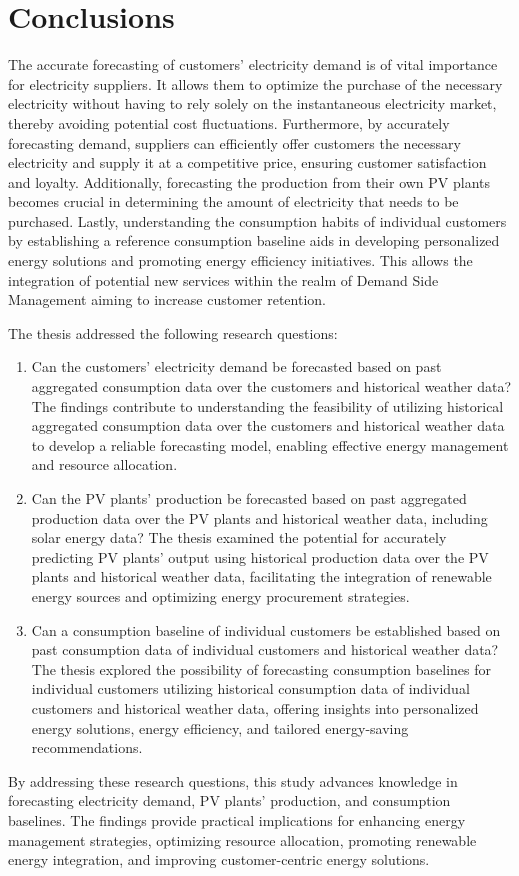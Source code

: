 \chapter{Conclusions}
\label{cha:conclusions}
\vspace{0.4 cm}

The accurate forecasting of customers' electricity demand is of vital importance for electricity suppliers.
It allows them to optimize the purchase of the necessary electricity without having to rely solely on the instantaneous electricity market, thereby avoiding potential cost fluctuations.
Furthermore, by accurately forecasting demand, suppliers can efficiently offer customers the necessary electricity and supply it at a competitive price, ensuring customer satisfaction and loyalty.
Additionally, forecasting the production from their own PV plants becomes crucial in determining the amount of electricity that needs to be purchased.
Lastly, understanding the consumption habits of individual customers by establishing a reference consumption baseline aids in developing personalized energy solutions and promoting energy efficiency initiatives.
This allows the integration of potential new services within the realm of Demand Side Management aiming to increase customer retention.

The thesis addressed the following research questions:
\begin{enumerate}
  \item Can the customers' electricity demand be forecasted based on past aggregated consumption data over the customers and historical weather data? The findings contribute to understanding the feasibility of utilizing historical aggregated consumption data over the customers and historical weather data to develop a reliable forecasting model, enabling effective energy management and resource allocation.
  \item Can the PV plants' production be forecasted based on past aggregated production data over the PV plants and historical weather data, including solar energy data? The thesis examined the potential for accurately predicting PV plants' output using historical production data over the PV plants and historical weather data, facilitating the integration of renewable energy sources and optimizing energy procurement strategies.
  \item Can a consumption baseline of individual customers be established based on past consumption data of individual customers and historical weather data? The thesis explored the possibility of forecasting consumption baselines for individual customers utilizing historical consumption data of individual customers and historical weather data, offering insights into personalized energy solutions, energy efficiency, and tailored energy-saving recommendations.
\end{enumerate}
By addressing these research questions, this study advances knowledge in forecasting electricity demand, PV plants' production, and consumption baselines.
The findings provide practical implications for enhancing energy management strategies, optimizing resource allocation, promoting renewable energy integration, and improving customer-centric energy solutions.

